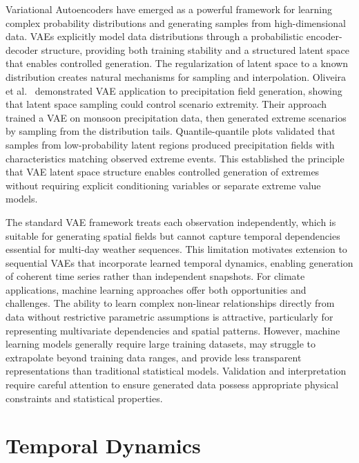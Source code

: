 Variational Autoencoders have emerged as a powerful framework for learning complex probability 
distributions and generating samples from high-dimensional data. VAEs explicitly model data 
distributions through a probabilistic encoder-decoder structure, providing both training 
stability and a structured latent space that enables controlled generation. The regularization 
of latent space to a known distribution creates natural mechanisms for sampling and 
interpolation. Oliveira et al.~\cite{vae-synthesis} demonstrated VAE application to 
precipitation field generation, showing that latent space sampling could control scenario 
extremity. Their approach trained a VAE on monsoon precipitation data, then generated extreme 
scenarios by sampling from the distribution tails. 
Quantile-quantile plots validated that samples from low-probability latent regions produced 
precipitation fields with characteristics matching observed extreme events. This established 
the principle that VAE latent space structure enables controlled generation of extremes without 
requiring explicit conditioning variables or separate extreme value models.

The standard VAE framework treats each observation independently, which is suitable for 
generating spatial fields but cannot capture temporal dependencies essential for multi-day 
weather sequences. This limitation motivates extension to sequential VAEs that incorporate 
learned temporal dynamics, enabling generation of coherent time series rather than independent 
snapshots. For climate applications, machine learning approaches offer both opportunities and 
challenges. The ability to learn complex non-linear relationships directly from data without 
restrictive parametric assumptions is attractive, particularly for representing multivariate 
dependencies and spatial patterns. However, machine learning models generally require large 
training datasets, may struggle to extrapolate beyond training data ranges, and provide less 
transparent representations than traditional statistical models. Validation and interpretation 
require careful attention to ensure generated data possess appropriate physical constraints 
and statistical properties.

\section{Temporal Dynamics}

